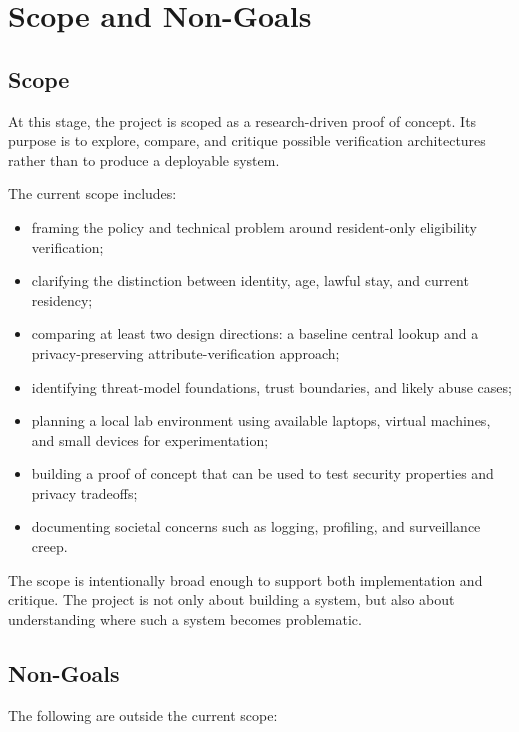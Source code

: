 \section{Scope and Non-Goals}

\subsection{Scope}

At this stage, the project is scoped as a research-driven proof of concept. Its purpose is to explore, compare, and critique possible verification architectures rather than to produce a deployable system.

The current scope includes:

\begin{itemize}
    \item framing the policy and technical problem around resident-only eligibility verification;
    \item clarifying the distinction between identity, age, lawful stay, and current residency;
    \item comparing at least two design directions: a baseline central lookup and a privacy-preserving attribute-verification approach;
    \item identifying threat-model foundations, trust boundaries, and likely abuse cases;
    \item planning a local lab environment using available laptops, virtual machines, and small devices for experimentation;
    \item building a proof of concept that can be used to test security properties and privacy tradeoffs;
    \item documenting societal concerns such as logging, profiling, and surveillance creep.
\end{itemize}

The scope is intentionally broad enough to support both implementation and critique. The project is not only about building a system, but also about understanding where such a system becomes problematic.

\subsection{Non-Goals}

The following are outside the current scope:

